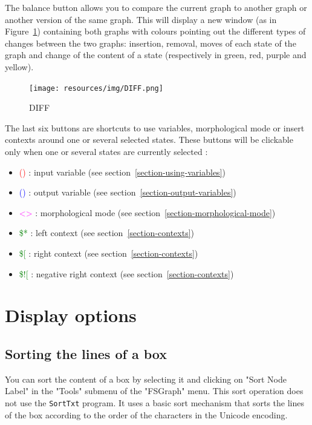 \bigskip
\noindent The balance button allows you to compare the current graph to another graph or another version of the same graph. This will display a new window (as in Figure~\ref{Graph-DIFF}) containing both graphs with colours pointing out the different types of changes between the two graphs: insertion, removal, moves of each state of the graph and change of the content of a state (respectively in green, red, purple and yellow).

\bigskip
\noindent 
\begin{figure}[!ht]
\begin{center}
\texttt{[image: resources/img/DIFF.png]}
\caption{DIFF\label{Graph-DIFF}}
\end{center}
\end{figure}
\bigskip
\noindent 

The last six buttons are shortcuts to use variables, morphological mode or insert contexts around one or several selected states. These buttons will be clickable only when one or several states are currently selected :
\begin{itemize}
\item \textcolor{red}{()}  : input variable	(see section~\ref{section-using-variables})
\item \textcolor{blue}{()} : output variable (see section~\ref{section-output-variables})
\item \textcolor{magenta}{<>}  : morphological mode (see section~\ref{section-morphological-mode})
\item \textcolor{green}{\$*} : left context (see section~\ref{section-contexts})
\item \textcolor{green}{\$[} : right context (see section~\ref{section-contexts})
\item \textcolor{green}{\$![} : negative right context (see section~\ref{section-contexts})
\end{itemize}

\bigskip
\section{Display options}

\subsection{Sorting the lines of a box}
You can sort the content of a box by selecting it and clicking on "Sort Node
Label" in the "Tools" submenu of the "FSGraph" menu. This sort operation does
not use the \verb+SortTxt+ program. It uses a basic sort mechanism that sorts
the lines of the box according to the order of the characters in the Unicode
encoding.

